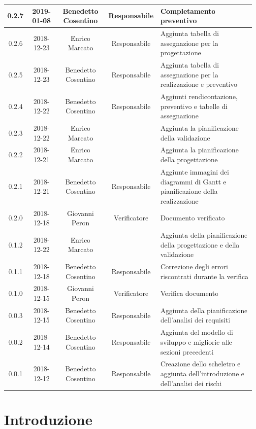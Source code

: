 \documentclass[11pt,a4paper]{article}
\begin{document}
{\begin{tabularx}{\textwidth}{ c | c | c | c | X }
		0.2.7 & 2019-01-08 & Benedetto Cosentino & Responsabile & Completamento preventivo \\ \hline	
		0.2.6 & 2018-12-23 & Enrico Marcato & Responsabile & Aggiunta tabella di assegnazione per la progettazione\\ \hline
		0.2.5 & 2018-12-23 & Benedetto Cosentino & Responsabile & Aggiunta tabella di assegnazione per la realizzazione e preventivo\\ \hline
		0.2.4 & 2018-12-22 & Benedetto Cosentino & Responsabile & Aggiunti rendicontazione, preventivo e tabelle di assegnazione \\ \hline
		0.2.3 & 2018-12-22 & Enrico Marcato &  & Aggiunta la pianificazione della validazione\\ \hline
		0.2.2 & 2018-12-21 & Enrico Marcato &  & Aggiunta la pianificazione della progettazione\\ \hline
		0.2.1 & 2018-12-21 & Benedetto Cosentino & Responsabile & Aggiunte immagini dei diagrammi di Gantt e pianificazione della realizzazione\\ \hline
		0.2.0 & 2018-12-18 & Giovanni Peron & Verificatore & Documento verificato\\ \hline
		0.1.2 & 2018-12-22 & Enrico Marcato &  & Aggiunta della pianificazione della progettazione e della validazione\\ \hline
		0.1.1 & 2018-12-18 & Benedetto Cosentino & Responsabile & Correzione degli errori riscontrati durante la verifica\\ \hline
		0.1.0 & 2018-12-15 & Giovanni Peron & Verificatore & Verifica documento\\ \hline
		0.0.3 & 2018-12-15 & Benedetto Cosentino & Responsabile & Aggiunta della pianificazione dell'analisi dei requisiti\\ \hline
		0.0.2 & 2018-12-14 & Benedetto Cosentino & Responsabile & Aggiunta del modello di sviluppo e migliorie alle sezioni precedenti\\ \hline
		0.0.1 & 2018-12-12 & Benedetto Cosentino & Responsabile & Creazione dello scheletro e aggiunta dell'introduzione e dell'analisi dei rischi\\ \hline
	\end{tabularx}
	\newpage
	\tableofcontents
	\listoffigures
	\listoftables
	\newpage	
	\section{Introduzione}
			
		\newpage	
	
}
\end{document}
